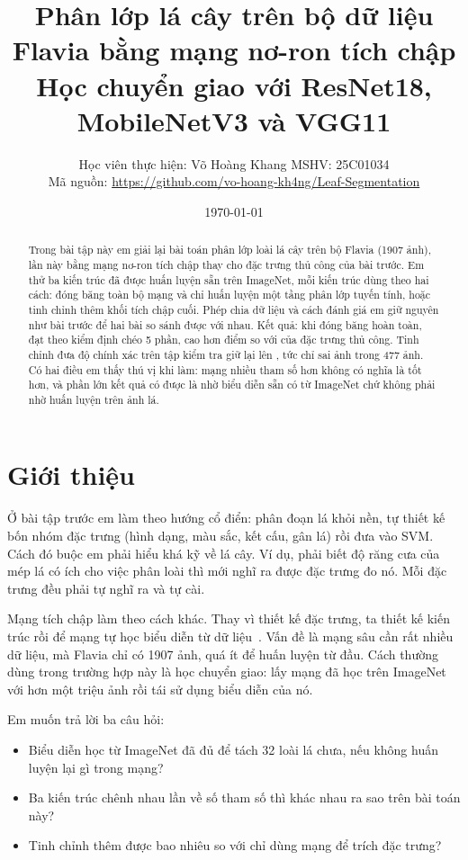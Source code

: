 \documentclass[11pt,a4paper]{article}
\title{\vspace{-1.5cm}Phân lớp lá cây trên bộ dữ liệu Flavia bằng mạng nơ-ron tích chập\\
\large Học chuyển giao với ResNet18, MobileNetV3 và VGG11}
\author{Học viên thực hiện: Võ Hoàng Khang \quad MSHV: 25C01034\\[0.3em]
\small Mã nguồn: \url{https://github.com/vo-hoang-kh4ng/Leaf-Segmentation}}
\date{\today}
\begin{document}
\maketitle
\vspace{-0.8cm}

\begin{abstract}
\noindent
Trong bài tập này em giải lại bài toán phân lớp \nclasses{} loài lá cây trên bộ Flavia (1907 ảnh),
lần này bằng mạng nơ-ron tích chập thay cho đặc trưng thủ công của bài trước. Em thử ba kiến trúc
đã được huấn luyện sẵn trên ImageNet, mỗi kiến trúc dùng theo hai cách: đóng băng toàn bộ mạng và
chỉ huấn luyện một tầng phân lớp tuyến tính, hoặc tinh chỉnh thêm khối tích chập cuối. Phép chia dữ
liệu và cách đánh giá em giữ nguyên như bài trước để hai bài so sánh được với nhau. Kết quả: khi
đóng băng hoàn toàn, \probebestname{} đạt \probebestcv{} theo kiểm định chéo 5 phần, cao hơn
\cnngain{} điểm so với \classicalcv{} của đặc trưng thủ công. Tinh chỉnh đưa độ chính xác trên tập
kiểm tra giữ lại lên \ftacc{}, tức chỉ sai \fterrors{} ảnh trong 477 ảnh. Có hai điều em thấy thú vị
khi làm: mạng nhiều tham số hơn không có nghĩa là tốt hơn, và phần lớn kết quả có được là nhờ biểu
diễn sẵn có từ ImageNet chứ không phải nhờ huấn luyện trên ảnh lá.
\end{abstract}

\section{Giới thiệu}

Ở bài tập trước em làm theo hướng cổ điển: phân đoạn lá khỏi nền, tự thiết kế bốn nhóm đặc trưng
(hình dạng, màu sắc, kết cấu, gân lá) rồi đưa vào SVM. Cách đó buộc em phải hiểu khá kỹ về lá cây.
Ví dụ, phải biết độ răng cưa của mép lá có ích cho việc phân loài thì mới nghĩ ra được đặc trưng đo
nó. Mỗi đặc trưng đều phải tự nghĩ ra và tự cài.

Mạng tích chập làm theo cách khác. Thay vì thiết kế đặc trưng, ta thiết kế kiến trúc rồi để mạng tự
học biểu diễn từ dữ liệu~\cite{lecun1998}. Vấn đề là mạng sâu cần rất nhiều dữ liệu, mà Flavia chỉ
có 1907 ảnh, quá ít để huấn luyện từ đầu. Cách thường dùng trong trường hợp này là học chuyển giao:
lấy mạng đã học trên ImageNet~\cite{deng2009} với hơn một triệu ảnh rồi tái sử dụng biểu diễn của nó.

Em muốn trả lời ba câu hỏi:
\begin{itemize}
  \item Biểu diễn học từ ImageNet đã đủ để tách 32 loài lá chưa, nếu không huấn luyện lại gì trong mạng?
  \item Ba kiến trúc chênh nhau \paramratio{} lần về số tham số thì khác nhau ra sao trên bài toán này?
  \item Tinh chỉnh thêm được bao nhiêu so với chỉ dùng mạng để trích đặc trưng?
\end{itemize}
\end{document}
